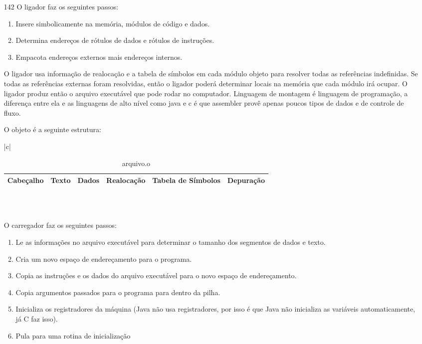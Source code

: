 \documentclass{article}
\begin{document}
\begin{enumerate}
\item[142] O ligador faz os seguintes passos:

\begin{enumerate}
\item Insere simbolicamente na memória, módulos de código e dados.
\item Determina endereços de rótulos de dados e rótulos de instruções.
\item Empacota endereços externos mais endereços internos.
\end{enumerate}

O ligador usa informação de realocação e a tabela de símbolos em cada módulo
objeto para resolver todas as referências indefinidas. Se todas as referências
externas foram resolvidas, então o ligador poderá determinar locais na memória
que cada módulo irá ocupar. O ligador produz então o arquivo executável que pode
rodar no computador. Linguagem de montagem é linguagem de programação, a
diferença entre ela e as linguagens de alto nível como java e c é que assembler
provê apenas poucos tipos de dados e de controle de fluxo.

O objeto é a seguinte estrutura:

\begin{table}[ht!]
\centering
\begin{tabular}{|c|}
\hline \\
\begin{tabular}{|c|c|c|c|c|c|}
\hline Cabeçalho &
       Texto &
       Dados &
       Realocação &
       Tabela de Símbolos &
       Depuração \\
\hline
\end{tabular} \\ \\ \hline
\end{tabular}
\caption{arquivo.o}
\end{table}

O carregador faz os seguintes passos:

\begin{enumerate}
\item Le as informações no arquivo executável para determinar o tamanho dos 
segmentos de dados e texto.
\item Cria um novo espaço de endereçamento para o programa.
\item Copia as instruções e os dados do arquivo executável para o novo espaço 
de endereçamento.
\item Copia argumentos passados para o programa para dentro da pilha.
\item Inicializa os registradores da máquina (Java não usa registradores, por 
isso é que Java não inicializa as variáveis automaticamente, já C faz isso).
\item Pula para uma rotina de inicialização
\end{enumerate}

\end{enumerate}
\end{document}
